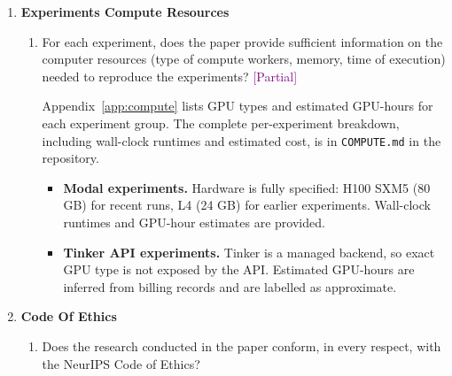 \documentclass{article}
\newcommand{\answerPartial}[1][]{\textcolor{purple}{[Partial] #1}}
\begin{document}
\begin{enumerate}
\item {\bf Experiments Compute Resources}
    \begin{enumerate}
        \item For each experiment, does the paper provide sufficient
              information on the computer resources (type of compute
              workers, memory, time of execution) needed to reproduce the
              experiments?
        \answerPartial{Appendix~\ref{app:compute} lists GPU types and
        estimated GPU-hours for each experiment group.  The complete
        per-experiment breakdown, including wall-clock runtimes and
        estimated cost, is in \texttt{COMPUTE.md} in the repository.
        \begin{itemize}
          \item \textbf{Modal experiments.}  Hardware is fully specified:
                H100 SXM5 (80 GB) for recent runs, L4 (24 GB) for earlier
                experiments.  Wall-clock runtimes and GPU-hour estimates are
                provided.
          \item \textbf{Tinker API experiments.}  Tinker is a managed
                backend, so exact GPU type is not exposed by the API.
                Estimated GPU-hours are inferred from billing
                records and are labelled as approximate.
        \end{itemize}}
    \end{enumerate}

\item {\bf Code Of Ethics}
    \begin{enumerate}
        \item Does the research conducted in the paper conform, in every
              respect, with the NeurIPS Code of Ethics?
    \end{enumerate}


\end{enumerate}
\end{document}
